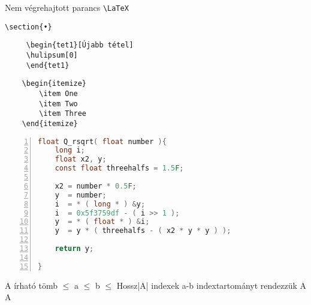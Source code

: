 \documentclass{article}
\theoremstyle{plain}
\newtheorem*{tet1}{Tétel}
\theoremstyle{definition}
\theoremstyle{remark}
\begin{document}
Nem végrehajtott parancs \verb|\LaTeX|\par
\verb|\section{•}|

\begin{forraskod}\caption {Tétel generálása}
	\begin{verbatim}
	 \begin{tet1}[Újabb tétel]
	 \hulipsum[0]
	 \end{tet1}\end{verbatim}
\end{forraskod}

\hulipsum

\begin{forraskod}\caption{Lista}
	\begin{verbatim}
	\begin{itemize}
    	\item One
    	\item Two
    	\item Three
	\end{itemize}
	\end{verbatim}
\end{forraskod}


\begin{lstlisting}[language=c, numbers=left, tabsize=5, frame=single, caption={Fast Inverse Square Root (Quake III Algorithm)}]
  float Q_rsqrt( float number ){
  	long i;
  	float x2, y;
  	const float threehalfs = 1.5F;

  	x2 = number * 0.5F;
  	y  = number;
  	i  = * ( long * ) &y;
  	i  = 0x5f3759df - ( i >> 1 );
  	y  = * ( float * ) &i;
  	y  = y * ( threehalfs - ( x2 * y * y ) );
  	
  	return y;
  
}
\end{lstlisting}
\pagebreak

\begin{algorithmic}[1]
		\Require A írható tömb
		 $\leq$ a $\leq$ b $\leq$ Hossz|A| indexek
		\Ensure a-b indextartományt rendezzük
		\State \Return A
		\Else
		\State {}
		\State {}
		\State {}
		\State \Return A
		\EndIf
		
	\EndProcedure
\end{algorithmic}
\end{document}
